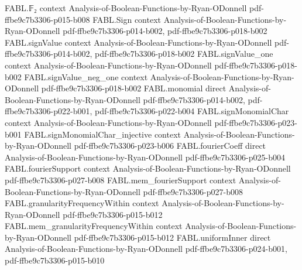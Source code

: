\begin{theorem}
\label{FABL.PCPPDescription.optimumAcceptance_lt_one_sub_rate_of_unsatisfiable}
\leanok
{}
\proofstep
  {FABL.𝔽₂}
  {context}
  {Analysis-of-Boolean-Functions-by-Ryan-ODonnell}
  {pdf-ffbe9c7b3306-p015-b008}
\proofstep
  {FABL.Sign}
  {context}
  {Analysis-of-Boolean-Functions-by-Ryan-ODonnell}
  {pdf-ffbe9c7b3306-p014-b002,
    pdf-ffbe9c7b3306-p018-b002}
\proofstep
  {FABL.signValue}
  {context}
  {Analysis-of-Boolean-Functions-by-Ryan-ODonnell}
  {pdf-ffbe9c7b3306-p014-b002,
    pdf-ffbe9c7b3306-p018-b002}
\proofstep
  {FABL.signValue_one}
  {context}
  {Analysis-of-Boolean-Functions-by-Ryan-ODonnell}
  {pdf-ffbe9c7b3306-p018-b002}
\proofstep
  {FABL.signValue_neg_one}
  {context}
  {Analysis-of-Boolean-Functions-by-Ryan-ODonnell}
  {pdf-ffbe9c7b3306-p018-b002}
\proofstep
  {FABL.monomial}
  {direct}
  {Analysis-of-Boolean-Functions-by-Ryan-ODonnell}
  {pdf-ffbe9c7b3306-p014-b002,
    pdf-ffbe9c7b3306-p022-b001,
    pdf-ffbe9c7b3306-p022-b004}
\proofstep
  {FABL.signMonomialChar}
  {context}
  {Analysis-of-Boolean-Functions-by-Ryan-ODonnell}
  {pdf-ffbe9c7b3306-p023-b001}
\proofstep
  {FABL.signMonomialChar_injective}
  {context}
  {Analysis-of-Boolean-Functions-by-Ryan-ODonnell}
  {pdf-ffbe9c7b3306-p023-b006}
\proofstep
  {FABL.fourierCoeff}
  {direct}
  {Analysis-of-Boolean-Functions-by-Ryan-ODonnell}
  {pdf-ffbe9c7b3306-p025-b004}
\proofstep
  {FABL.fourierSupport}
  {context}
  {Analysis-of-Boolean-Functions-by-Ryan-ODonnell}
  {pdf-ffbe9c7b3306-p027-b008}
\proofstep
  {FABL.mem_fourierSupport}
  {context}
  {Analysis-of-Boolean-Functions-by-Ryan-ODonnell}
  {pdf-ffbe9c7b3306-p027-b008}
\proofstep
  {FABL.granularityFrequencyWithin}
  {context}
  {Analysis-of-Boolean-Functions-by-Ryan-ODonnell}
  {pdf-ffbe9c7b3306-p015-b012}
\proofstep
  {FABL.mem_granularityFrequencyWithin}
  {context}
  {Analysis-of-Boolean-Functions-by-Ryan-ODonnell}
  {pdf-ffbe9c7b3306-p015-b012}
\proofstep
  {FABL.uniformInner}
  {direct}
  {Analysis-of-Boolean-Functions-by-Ryan-ODonnell}
  {pdf-ffbe9c7b3306-p024-b001,
    pdf-ffbe9c7b3306-p015-b010}

\end{theorem}
